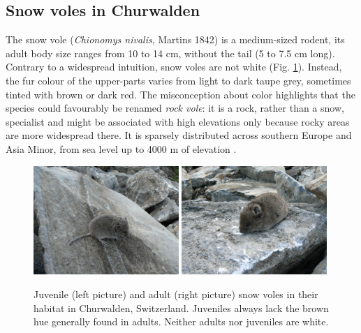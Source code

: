 \subsection{Snow voles in Churwalden}
The snow vole (\textit{Chionomys nivalis}, Martins 1842) is a medium-sized rodent, its adult body size ranges from 10 to 14 cm, without the tail (5 to 7.5 cm long). Contrary to a widespread intuition, snow voles are not white (Fig. \ref{fig:juvvole}). Instead, the fur colour of the upper-parts varies from light to dark taupe grey, sometimes tinted with brown or dark red. The misconception about color highlights that the species could favourably be renamed \emph{rock vole}: it is a rock, rather than a snow, specialist \parencite{Luque-larena2002} and might be associated with high elevations only because rocky areas are more widespread there. It is sparsely distributed across southern Europe and Asia Minor, from sea level up to 4000 m of elevation \parencite{Janeau1997}.
\begin{figure}[ht]
	\includegraphics[width=0.49\textwidth]{FiguresGeneral/juvvole.JPG}
	\hspace{0.02\textwidth}
	\includegraphics[width=0.49\textwidth]{FiguresGeneral/advole.JPG}
	\caption{Juvenile (left picture) and adult (right picture) snow voles in their habitat in Churwalden, Switzerland. Juveniles always lack the brown hue generally found in adults. Neither adults nor juveniles are white.}
	\label{fig:juvvole}
\end{figure}

